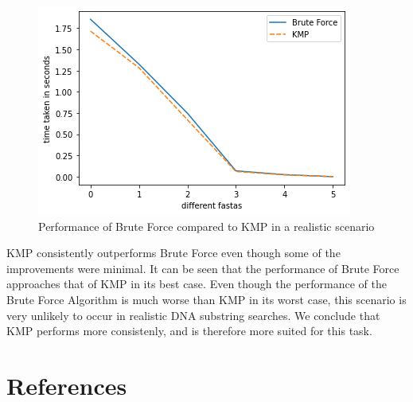 \begin{figure}[H]
    \centering
    \begin{minipage}[b]{0.49\textwidth}
    \includegraphics[width=\textwidth]{images/graph.png} 
    \caption{Performance of Brute Force compared to KMP in a realistic scenario}
    \label{fig:graph}
  \end{minipage}
\end{figure}

\noindent
KMP consistently outperforms Brute Force even though some of the improvements were minimal. It can be seen that the performance of Brute Force approaches that of KMP in its best case. Even though the performance of the Brute Force Algorithm is much worse than KMP in its worst case, this scenario is very unlikely to occur in realistic DNA substring searches. We conclude that KMP performs more consistenly, and is therefore more suited for this task.

\nocite{geeksforgeeks_kmp}
\nocite{wikipedia_2020}
\nocite{geeksforgeeks_bf}

\section*{References}
\printbibliography[heading=none]

